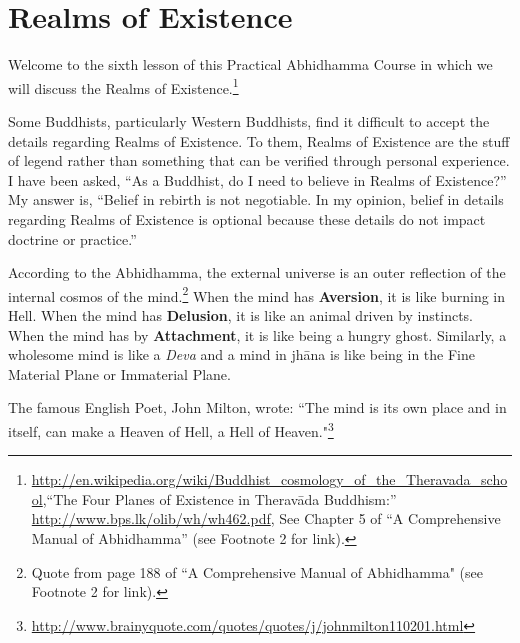 \section{Realms of Existence}

Welcome to the sixth lesson of this Practical Abhidhamma Course in which we will discuss the Realms of Existence.\footnote{\url{http://en.wikipedia.org/wiki/Buddhist_cosmology_of_the_Theravada_school},\linebreak “The Four Planes of Existence in Theravāda Buddhism:” \url{http://www.bps.lk/olib/wh/wh462.pdf}, See Chapter 5 of “A Comprehensive Manual of Abhidhamma” (see Footnote 2 for link).}

Some Buddhists, particularly Western Buddhists, find it difficult to accept the details regarding Realms of Existence.  To them, Realms of Existence are the stuff of legend rather than something that can be verified through personal experience. I have been asked, “As a Buddhist, do I need to believe in Realms of Existence?” My answer is, “Belief in rebirth is not negotiable. In my opinion, belief in details regarding Realms of Existence is optional because these details do not impact doctrine or practice.”

According to the Abhidhamma, the external universe is an outer reflection of the internal cosmos of the mind.\footnote{Quote from page 188 of “A Comprehensive Manual of Abhidhamma" (see Footnote 2 for link).} When the mind has \textbf{Aversion}, it is like burning in Hell. When the mind has \textbf{Delusion}, it is like an animal driven by instincts. When the mind has by \textbf{Attachment}, it is like being a hungry ghost. Similarly, a wholesome mind is like a \textit{Deva} and a mind in jhāna is like being in the Fine Material Plane or Immaterial Plane.

The famous English Poet, John Milton, wrote: ``The mind is its own place and in itself, can make a Heaven of Hell, a Hell of Heaven."\footnote{\url{http://www.brainyquote.com/quotes/quotes/j/johnmilton110201.html}}

